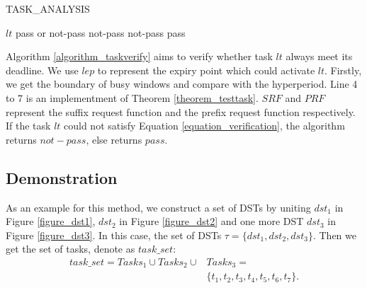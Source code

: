 \documentclass[10pt,conference]{IEEEtran}
\begin{document}
\begin{algorithm}
  \caption{TASK\_ANALYSIS}
  \label{algorithm_taskverify}
  \begin{algorithmic}[1]
    \REQUIRE $lt$
    \ENSURE pass or not-pass
    \STATE \Return not-pass
    \ELSE
    \STATE \Return not-pass
    \ENDIF
    \ENDFOR
    \ENDFOR
    \ENDFOR
    \STATE \Return pass
    \ENDIF
  \end{algorithmic}
\end{algorithm}

Algorithm \ref{algorithm_taskverify} aims to verify whether task $lt$ always meet its deadline. We use $lep$ to represent the expiry point which could activate $lt$. Firstly, we get the boundary of busy windows and compare with the hyperperiod. Line 4 to 7 is an implementment of Theorem \ref{theorem_testtask}. $SRF$ and $PRF$ represent the suffix request function and the prefix request function respectively. If the task $lt$ could not satisfy Equation \ref{equation_verification}, the algorithm returns $not-pass$, else returns $pass$.

\subsection{Demonstration}\label{section_demonstration}
As an example for this method, we construct a set of DSTs by uniting $dst_1$ in Figure \ref{figure_dst1}, $dst_2$ in Figure \ref{figure_dst2} and one more DST $dst_3$ in Figure \ref{figure_dst3}. In this case, the set of DSTs $\tau =\{dst_1,dst_2,dst_3\}$. Then we get the set of tasks, denote as $task\_set$: 
\[\begin{split}
task\_set=Tasks_1\cup Tasks_2\cup &Tasks_3=
\\
&\{t_1,t_2,t_3,t_4,t_5,t_6,t_7\}.
\end{split}\]
\end{document}
